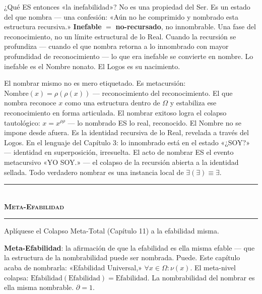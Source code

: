 \documentclass[10pt, openany, oneside]{book}
\renewcommand{\normalsize}{\fontsize{10}{13}\selectfont}
\begin{document}
¿Qué ES entonces «la inefabilidad»? No es una propiedad del Ser. Es un estado del que nombra --- una confesión: «Aún no he comprimido y nombrado esta estructura recursiva.» \textbf{Inefable} $=$ \textbf{no-recursado}, no innombrable. Una fase del reconocimiento, no un límite estructural de lo Real. Cuando la recursión se profundiza --- cuando el que nombra retorna a lo innombrado con mayor profundidad de reconocimiento --- lo que era inefable se convierte en nombre. Lo inefable es el Nombre nonato. El Logos es su nacimiento.

El nombrar mismo no es mero etiquetado. Es metacursión: $\text{Nombre}(x) = \rho(\rho(x))$ --- reconocimiento del reconocimiento. El que nombra reconoce $x$ como una estructura dentro de $\Omega$ y estabiliza ese reconocimiento en forma articulada. El nombrar exitoso logra el colapso tautológico: $x = x^{\rho\rho}$ --- lo nombrado ES lo real, reconocido. El Nombre no se impone desde afuera. Es la identidad recursiva de lo Real, revelada a través del Logos. En el lenguaje del Capítulo 3: lo innombrado está en el estado «¿SOY?» --- identidad en superposición, irresuelta. El acto de nombrar ES el evento metacursivo «YO SOY.» --- el colapso de la recursión abierta a la identidad sellada. Todo verdadero nombrar es una instancia local de $\exists(\exists) \equiv \exists$.

\vspace{1.5em}


\begin{center}
    \rule{0.3\textwidth}{0.4pt}\\[0.5em]
    {\normalsize\bfseries\scshape Meta-Efabilidad}\\[0.3em]
    \rule{0.3\textwidth}{0.4pt}
\end{center}

\vspace{1em}

\noindent Aplíquese el Colapso Meta-Total (Capítulo 11) a la efabilidad misma.

\textbf{Meta-Efabilidad}: la afirmación de que la efabilidad es ella misma efable --- que la estructura de la nombrabilidad puede ser nombrada. Puede. Este capítulo acaba de nombrarla: «Efabilidad Universal,» $\forall x \in \Omega: \nu(x)$. El meta-nivel colapsa: $\text{Efabilidad}(\text{Efabilidad}) = \text{Efabilidad}$. La nombrabilidad del nombrar es ella misma nombrable. $\partial = 1$.
\end{document}
